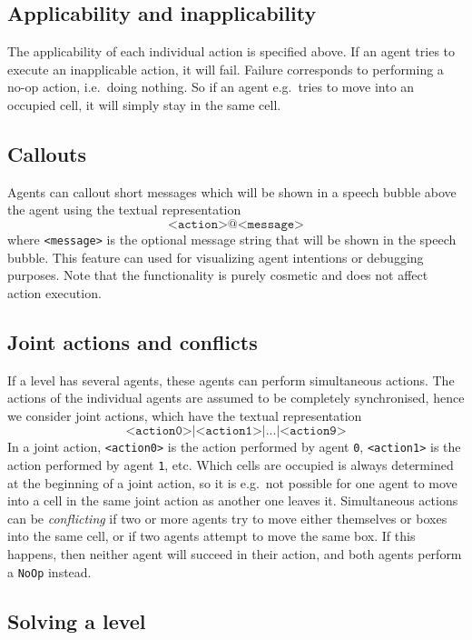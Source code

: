 \documentclass[12pt,a4paper]{article}
\begin{document}
\subsection{Applicability and inapplicability}
The applicability of each individual action is specified above. If an agent tries to execute an inapplicable action, it will fail. Failure corresponds to performing a no-op action, i.e.\ doing nothing. So if an agent e.g.\ tries to move into an occupied cell, it will simply stay in the same cell. 

\subsection{Callouts}
Agents can callout short messages which will be shown in a speech bubble above the agent using the textual representation
\[
  \texttt{<action>@<message>}
\]
where \texttt{<message>} is the optional message string that will be shown in the speech bubble.
This feature can used for visualizing agent intentions or debugging purposes.
Note that the functionality is purely cosmetic and does not affect action execution.

\subsection{Joint actions and conflicts}
If a level has several agents, these agents can perform simultaneous actions. The actions of the individual agents are assumed to be completely synchronised, hence we consider joint actions, which have the textual representation
\[
  \texttt{<action0>|<action1>|...|<action9>}
\]
In a joint action, \texttt{<action0>} is the action performed by agent \texttt{0}, \texttt{<action1>} is the action performed by agent \texttt{1}, etc. Which cells are occupied is always determined at the beginning of a joint action, so it is e.g.\ not possible for one agent to move into a cell in the same joint action as another one leaves it. Simultaneous actions can be \emph{conflicting} if two or more agents try to move either themselves or boxes into the same cell, or if two agents attempt to move the same box. If this happens, then neither agent will succeed in their action, and both agents perform a \texttt{NoOp} instead.

\subsection{Solving a level}
\end{document}
